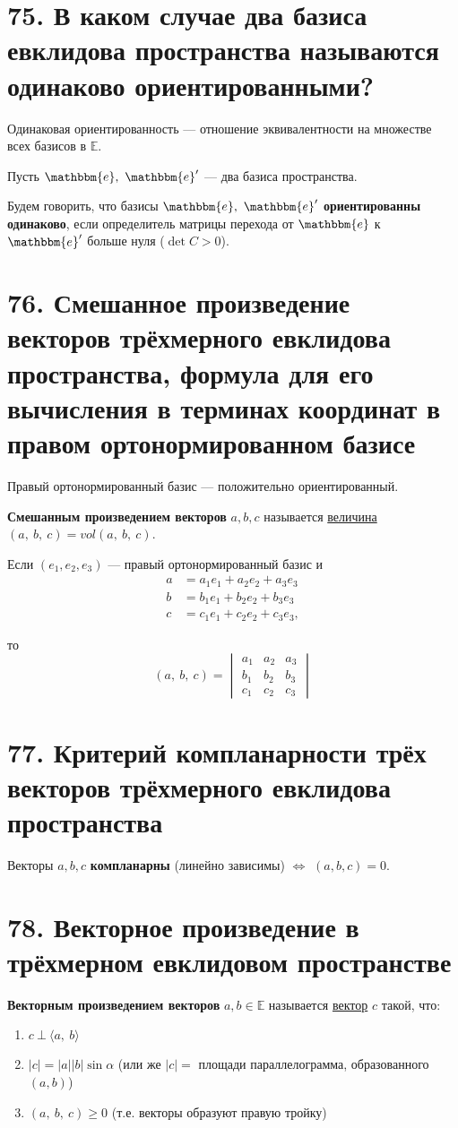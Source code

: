 \documentclass[a4paper, 12pt]{article}
\newcommand{\E}{\mathbb{E}}
\newcommand{\me}{\mathbbm{e}}
\begin{document}
\section*{75. В каком случае два базиса евклидова пространства называются одинаково ориентированными?}
Одинаковая ориентированность --- отношение эквивалентности на множестве всех базисов в $\E$.

Пусть $\me,\ \me'$ --- два базиса пространства.

Будем говорить, что базисы $\me,\ \me'$ \textbf{ориентированны одинаково}, если определитель матрицы перехода от $\me$ к $\me'$ больше нуля ($\det C > 0$).

\section*{76. Смешанное произведение векторов трёхмерного евклидова пространства, формула для его вычисления в терминах координат в правом ортонормированном базисе}
Правый ортонормированный базис --- положительно ориентированный.

\textbf{Смешанным произведением векторов} $a, b, c$ называется \underline{величина} $(a,\ b,\ c) = vol(a,\ b,\ c)$.

Если $(e_1, e_2, e_3)$ --- правый ортонормированный базис и
\vspace{-2mm}
\begin{align*}
a &= a_1e_1 + a_2e_2 + a_3e_3 \\
b &= b_1e_1 + b_2e_2 + b_3e_3 \\
c &= c_1e_1 + c_2e_2 + c_3e_3,
\end{align*}

\vspace{-3mm}
то
\vspace{-2mm}
\[
(a,\ b,\ c) = 
\begin{vmatrix}
a_1 & a_2 & a_3 \\
b_1 & b_2 & b_3 \\
c_1 & c_2 & c_3
\end{vmatrix}
\]

\section*{77. Критерий компланарности трёх векторов трёхмерного евклидова пространства}
Векторы $a, b, c$ \textbf{компланарны} (линейно зависимы) $\Longleftrightarrow$ $(a, b, c) = 0$.

\section*{78. Векторное произведение в трёхмерном евклидовом пространстве}
\textbf{Векторным произведением векторов} $a, b \in \E$ называется \underline{вектор} $c$ такой, что:
\begin{enumerate}
    ,3em
    \item $c\ \bot\ \langle a,\ b \rangle$
    \item $|c| = |a||b|\sin\alpha$ (или же $|c| =$ площади параллелограмма, образованного $(a, b)$)
    \item $(a,\ b,\ c) \geqslant 0$ (т.е. векторы образуют правую тройку)
\end{enumerate}
\end{document}

